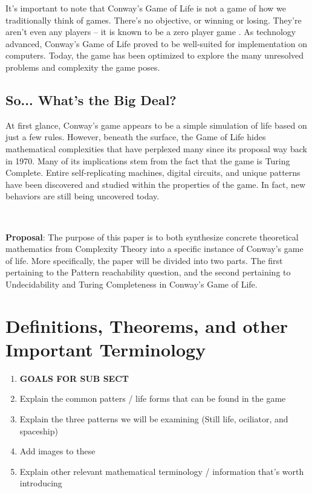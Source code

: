 \documentclass{article}
\theoremstyle{definition}
\theoremstyle{plain}
\theoremstyle{plain}
\begin{document}
It’s important to note that Conway’s Game of Life is not a game of how we traditionally think of games. There’s no objective, or winning or losing. They’re aren’t even any players – it is known to be a zero player game \cite{Beginning_Life_2006}. As technology advanced, Conway’s Game of Life proved to be well-suited for implementation on computers. Today, the game has been optimized to explore the many unresolved problems and complexity the game poses. 

\subsection{So... What's the Big Deal?}

At first glance, Conway’s game appears to be a simple simulation of life based on just a few rules. However, beneath the surface, the Game of Life hides mathematical complexities that have perplexed many since its proposal way back in 1970. Many of its implications stem from the fact that the game is Turing Complete. Entire self-replicating machines, digital circuits, and unique patterns have been discovered and studied within the properties of the game. In fact, new behaviors are still being uncovered today. 

\ 

\textbf{Proposal}: The purpose of this paper is to both synthesize concrete theoretical mathematics from Complexity Theory into a specific instance of Conway's game of life. More specifically, the paper will be divided into two parts. The first pertaining to the Pattern reachability question, and the second pertaining to Undecidability and Turing Completeness in Conway’s Game of Life. 


\section{Definitions, Theorems, and other Important Terminology}
\begin{enumerate}
  \item[] \textbf{GOALS FOR SUB SECT}
  \item Explain the common patters / life forms that can be found in the game
  \item Explain the three patterns we will be examining (Still life, ociliator, and spaceship)
  \item Add images to these 
  \item Explain other relevant mathematical terminology / information that's worth introducing 

\end{enumerate}
\end{document}
